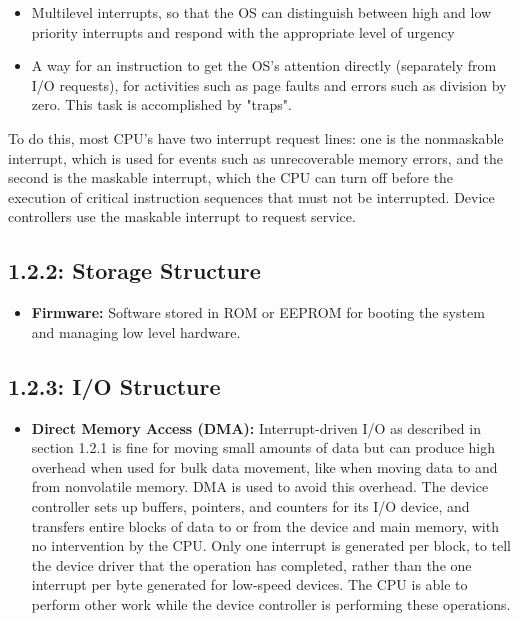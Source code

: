 \documentclass[12pt]{article}
\begin{document}
\begin{itemize}
\begin{itemize}
            \item Multilevel interrupts, so that the OS can distinguish between high and low priority interrupts and respond with the appropriate level of urgency
            \item A way for an instruction to get the OS's attention directly (separately from I/O requests), for activities such as page faults and errors such as division by zero. This task is accomplished by "traps".
        \end{itemize}
        To do this, most CPU's have two interrupt request lines: one is the nonmaskable interrupt, which is used for events such as unrecoverable memory errors, and the second is the maskable interrupt, which the CPU can turn off before the execution of critical instruction sequences that must not be interrupted. Device controllers use the maskable interrupt to request service.
\end{itemize}

\subsection*{1.2.2: Storage Structure}

\begin{itemize}
    \item \textbf{Firmware:} Software stored in ROM or EEPROM for booting the system and managing low level hardware.
\end{itemize}

\subsection*{1.2.3: I/O Structure}

\begin{itemize}
    \item \textbf{Direct Memory Access (DMA):} Interrupt-driven I/O as described in section 1.2.1 is fine for moving small amounts of data but can produce high overhead when used for bulk data movement, like when moving data to and from nonvolatile memory. DMA is used to avoid this overhead. The device controller sets up buffers, pointers, and counters for its I/O device, and transfers entire blocks of data to or from the device and main memory, with no intervention by the CPU. Only one interrupt is generated per block, to tell the device driver that the operation has completed, rather than the one interrupt per byte generated for low-speed devices. The CPU is able to perform other work while the device controller is performing these operations.
\end{itemize}
\end{document}
